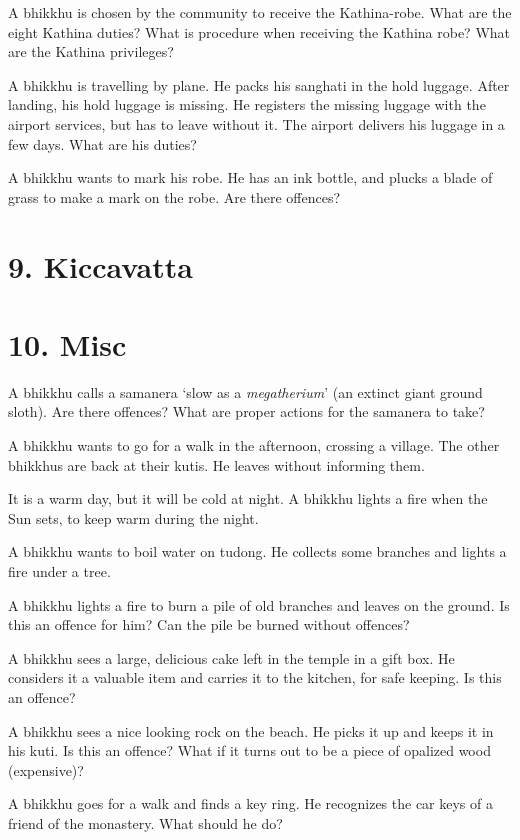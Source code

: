 A bhikkhu is chosen by the community to receive the Kathina-robe. What
are the eight Kathina duties? What is procedure when receiving the
Kathina robe? What are the Kathina privileges?

A bhikkhu is travelling by plane. He packs his sanghati in the hold
luggage. After landing, his hold luggage is missing. He registers the
missing luggage with the airport services, but has to leave without it.
The airport delivers his luggage in a few days. What are his duties?

A bhikkhu wants to mark his robe. He has an ink bottle, and plucks a
blade of grass to make a mark on the robe. Are there offences?

\section{9. Kiccavatta}

\section{10. Misc}

A bhikkhu calls a samanera `slow as a \emph{megatherium}' (an extinct
giant ground sloth). Are there offences? What are proper actions for the
samanera to take?

A bhikkhu wants to go for a walk in the afternoon, crossing a village.
The other bhikkhus are back at their kutis. He leaves without informing
them.

It is a warm day, but it will be cold at night. A bhikkhu lights a fire
when the Sun sets, to keep warm during the night.

A bhikkhu wants to boil water on tudong. He collects some branches and
lights a fire under a tree.

A bhikkhu lights a fire to burn a pile of old branches and leaves on the
ground. Is this an offence for him? Can the pile be burned without
offences?

A bhikkhu sees a large, delicious cake left in the temple in a gift box.
He considers it a valuable item and carries it to the kitchen, for safe
keeping. Is this an offence?

A bhikkhu sees a nice looking rock on the beach. He picks it up and
keeps it in his kuti. Is this an offence? What if it turns out to be a
piece of opalized wood (expensive)?

A bhikkhu goes for a walk and finds a key ring. He recognizes the car
keys of a friend of the monastery. What should he do?

